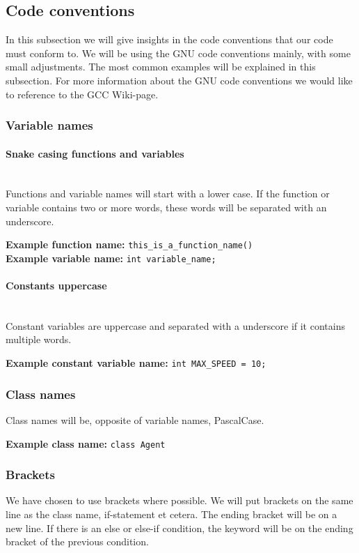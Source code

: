 \subsection{Code conventions}
In this subsection we will give insights in the code conventions that our code must conform to. We will be using the GNU code conventions mainly, with some small adjustments.
The most common examples will be explained in this subsection. For more information about the GNU code conventions we would like to reference to the GCC Wiki-page. \cite{gccwcc}
\subsubsection{Variable names}
\paragraph{Snake casing functions and variables}
~\\Functions and variable names will start with a lower case. If the function or variable contains two or more words, these words will be separated with an underscore.

\textbf{Example function name:} \lstinline{this_is_a_function_name()}
~\\\textbf{Example variable name:} \lstinline{int variable_name;}

\paragraph{Constants uppercase}
~\\Constant variables are uppercase and separated with a underscore if it contains multiple words.

\textbf{Example constant variable name:} \lstinline{int MAX_SPEED = 10;}

\subsubsection{Class names}
Class names will be, opposite of variable names, PascalCase.

\textbf{Example class name:} \lstinline{class Agent}\clearpage

\subsubsection{Brackets}
We have chosen to use brackets where possible. We will put brackets on the same line as the class name, if-statement et cetera. The ending bracket will be on a new line.
If there is an else or else-if condition, the keyword will be on the ending bracket of the previous condition.

